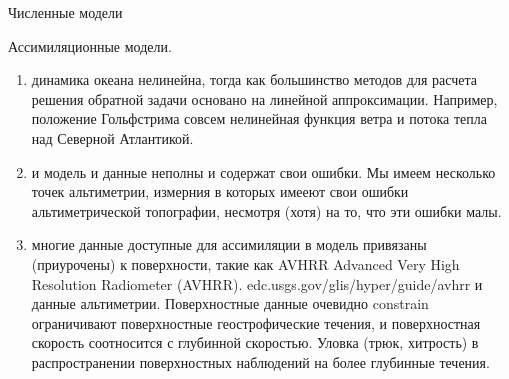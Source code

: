 \begin{chapter}{Численные модели}
\begin{section}{Ассимиляционные модели.}
\begin{enumerate}
\item
динамика океана нелинейна, тогда как большинство методов для расчета
решения обратной задачи основано на линейной аппроксимации. Например,
положение Гольфстрима совсем нелинейная функция ветра и потока тепла
над Северной Атлантикой.
%

\item
и модель и данные неполны и содержат свои ошибки. Мы имеем несколько
точек альтиметрии, измерния в которых имееют свои ошибки
альтиметрической топографии, несмотря (хотя) на то, что эти ошибки
малы.
%

\item
многие данные доступные для ассимиляции в модель привязаны
(приурочены) к поверхности, такие как AVHRR Advanced Very High
Resolution Radiometer (AVHRR). edc.usgs.gov/glis/hyper/guide/avhrr и
данные альтиметрии. Поверхностные данные очевидно constrain
ограничивают поверхностные геострофические течения, и поверхностная
скорость соотносится с глубинной скоростью. Уловка (трюк, хитрость) в
распространении поверхностных наблюдений на более глубинные течения.
%
\end{enumerate}


\end{section}
\end{chapter}
